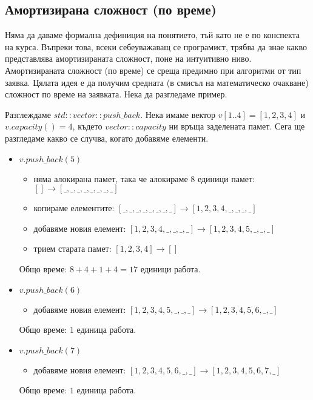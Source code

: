 \subsection{Амортизирана сложност (по време)}

Няма да даваме формална дефиниция на понятието, тъй като не е по конспекта на курса. Въпреки това, всеки себеуважаващ се програмист, трябва да знае какво представлява амортизираната сложност, поне на интуитивно ниво. Амортизираната сложност (по време) се среща предимно при алгоритми от тип заявка. Цялата идея е да получим средната (в смисъл на математическо очакване) сложност по време на заявката. Нека да разгледаме пример.\newline\newline

\begin{examplecp}
	Разглеждаме $std::vector::push\_back$. Нека имаме вектор $v[1..4]=[1,2,3,4]$ и $v.capacity()=4$, където $vector::capacity$ ни връща заделената памет. Сега ще разгледаме какво се случва, когато добавяме елементи.
	\begin{itemize}
		\item $v.push\_back(5)$
		\begin{itemize}
			\item няма алокирана памет, така че алокираме 8 единици памет: $[]\to[\_,\_,\_,\_,\_,\_,\_,\_]$
			\item копираме елементите: $[\_,\_,\_,\_,\_,\_,\_,\_]\to[1,2,3,4,\_,\_,\_,\_]$
			\item добавяме новия елемент: $[1,2,3,4,\_,\_,\_,\_]\to[1,2,3,4,5,\_,\_,\_]$
			\item трием старата памет: $[1,2,3,4]\to[]$
		\end{itemize}
		Общо време: $8+4+1+4=17$ единици работа.
		
		\item $v.push\_back(6)$
		\begin{itemize}
			\item добавяме новия елемент: $[1,2,3,4,5,\_,\_,\_]\to[1,2,3,4,5,6,\_,\_]$
		\end{itemize}
		Общо време: $1$ единица работа.
		
		\item $v.push\_back(7)$
		\begin{itemize}
			\item добавяме новия елемент: $[1,2,3,4,5,6,\_,\_]\to[1,2,3,4,5,6,7,\_]$
		\end{itemize}
		Общо време: $1$ единица работа.
		

\end{itemize}
\end{examplecp}

